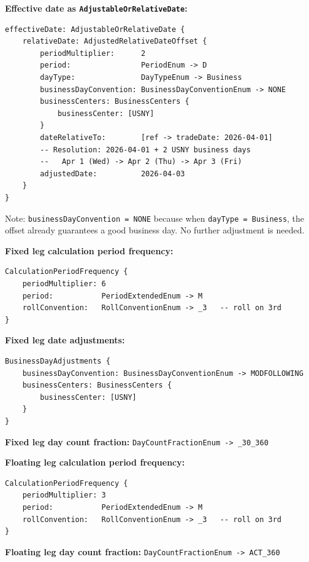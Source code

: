 \documentclass[11pt,a4paper]{article}
\begin{document}
\smallskip
\noindent\textbf{Effective date as \texttt{AdjustableOrRelativeDate}:}

\begin{lstlisting}
effectiveDate: AdjustableOrRelativeDate {
    relativeDate: AdjustedRelativeDateOffset {
        periodMultiplier:      2
        period:                PeriodEnum -> D
        dayType:               DayTypeEnum -> Business
        businessDayConvention: BusinessDayConventionEnum -> NONE
        businessCenters: BusinessCenters {
            businessCenter: [USNY]
        }
        dateRelativeTo:        [ref -> tradeDate: 2026-04-01]
        -- Resolution: 2026-04-01 + 2 USNY business days
        --   Apr 1 (Wed) -> Apr 2 (Thu) -> Apr 3 (Fri)
        adjustedDate:          2026-04-03
    }
}
\end{lstlisting}

\noindent Note: \texttt{businessDayConvention = NONE} because when \texttt{dayType = Business}, the offset already guarantees a good business day. No further adjustment is needed.

\smallskip
\noindent\textbf{Fixed leg calculation period frequency:}

\begin{lstlisting}
CalculationPeriodFrequency {
    periodMultiplier: 6
    period:           PeriodExtendedEnum -> M
    rollConvention:   RollConventionEnum -> _3   -- roll on 3rd
}
\end{lstlisting}

\noindent\textbf{Fixed leg date adjustments:}

\begin{lstlisting}
BusinessDayAdjustments {
    businessDayConvention: BusinessDayConventionEnum -> MODFOLLOWING
    businessCenters: BusinessCenters {
        businessCenter: [USNY]
    }
}
\end{lstlisting}

\noindent\textbf{Fixed leg day count fraction:} \texttt{DayCountFractionEnum -> \_30\_360}

\smallskip
\noindent\textbf{Floating leg calculation period frequency:}

\begin{lstlisting}
CalculationPeriodFrequency {
    periodMultiplier: 3
    period:           PeriodExtendedEnum -> M
    rollConvention:   RollConventionEnum -> _3   -- roll on 3rd
}
\end{lstlisting}

\noindent\textbf{Floating leg day count fraction:} \texttt{DayCountFractionEnum -> ACT\_360}
\end{document}
